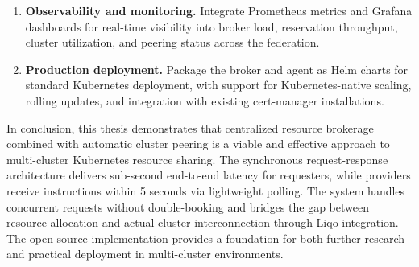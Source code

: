 \begin{enumerate}
    \item \textbf{Observability and monitoring.}
    Integrate Prometheus metrics and Grafana dashboards for real-time visibility into broker load, reservation throughput, cluster utilization, and peering status across the federation.

    \item \textbf{Production deployment.}
    Package the broker and agent as Helm charts for standard Kubernetes deployment, with support for Kubernetes-native scaling, rolling updates, and integration with existing cert-manager installations.
\end{enumerate}

\bigskip

\noindent In conclusion, this thesis demonstrates that centralized resource brokerage combined with automatic cluster peering is a viable and effective approach to multi-cluster Kubernetes resource sharing. The synchronous request-response architecture delivers sub-second end-to-end latency for requesters, while providers receive instructions within 5 seconds via lightweight polling. The system handles concurrent requests without double-booking and bridges the gap between resource allocation and actual cluster interconnection through Liqo integration. The open-source implementation provides a foundation for both further research and practical deployment in multi-cluster environments.
